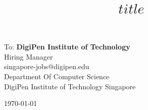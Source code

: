 \documentclass[11pt, a4paper]{article}
\title{$title$}
\begin{document}
\maketitle
\vspace{1em}

\begin{minipage}[t]{0.49\textwidth} 
  To: {\bf DigiPen Institute of Technology} \\
  {
    Hiring Manager\\
    singapore-jobs@digipen.edu\\
    Department Of Computer Science\\
    DigiPen Institute of Technology Singapore
  }
\end{minipage}\hfill\begin{minipage}[t]{0.49\textwidth}
  \begin{flushright}\today\end{flushright}
\end{minipage}

\vspace{2em}
\end{document}

